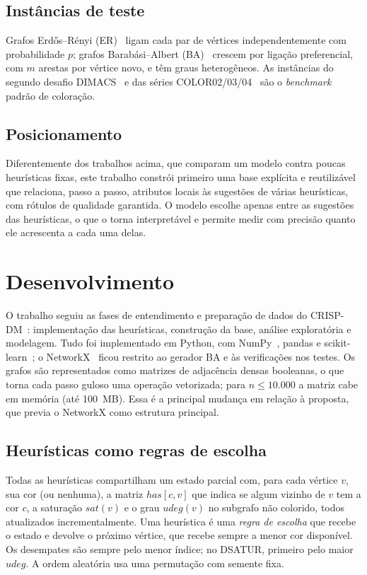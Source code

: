 \documentclass[conference,a4paper]{IEEEtran}
\begin{document}
\subsection{Instâncias de teste}
Grafos Erdős–Rényi (ER)~\cite{erdos1959} ligam cada par de vértices independentemente com
probabilidade $p$; grafos Barabási–Albert (BA)~\cite{barabasi1999} crescem por ligação
preferencial, com $m$ arestas por vértice novo, e têm graus heterogêneos. As instâncias do
segundo desafio DIMACS~\cite{johnson1996} e das séries COLOR02/03/04~\cite{color04} são o
\emph{benchmark} padrão de coloração.

\subsection{Posicionamento}
Diferentemente dos trabalhos acima, que comparam um modelo contra poucas heurísticas fixas,
este trabalho constrói primeiro uma base explícita e reutilizável que relaciona, passo a
passo, atributos locais às sugestões de várias heurísticas, com rótulos de qualidade
garantida. O modelo escolhe apenas entre as sugestões das heurísticas, o que o torna
interpretável e permite medir com precisão quanto ele acrescenta a cada uma delas.

\section{Desenvolvimento}\label{sec:dev}

O trabalho seguiu as fases de entendimento e preparação de dados do
CRISP-DM~\cite{wirth2000}: implementação das heurísticas, construção da base, análise
exploratória e modelagem. Tudo foi implementado em Python, com NumPy~\cite{harris2020},
pandas e scikit-learn~\cite{pedregosa2011}; o NetworkX~\cite{hagberg2008} ficou restrito ao
gerador BA e às verificações nos testes. Os grafos são representados como matrizes de
adjacência densas booleanas, o que torna cada passo guloso uma operação vetorizada; para
$n \le 10.000$ a matriz cabe em memória (até 100~MB). Essa é a principal mudança em relação à
proposta, que previa o NetworkX como estrutura principal.

\subsection{Heurísticas como regras de escolha}\label{sec:heur}
Todas as heurísticas compartilham um estado parcial com, para cada vértice $v$, sua cor
(ou nenhuma), a matriz $\mathit{has}[c,v]$ que indica se algum vizinho de $v$ tem a cor $c$, a
saturação $\mathit{sat}(v)$ e o grau $\mathit{udeg}(v)$ no subgrafo não colorido, todos
atualizados incrementalmente. Uma heurística é uma \emph{regra de escolha} que recebe o estado
e devolve o próximo vértice, que recebe sempre a menor cor disponível. Os desempates são
sempre pelo menor índice; no DSATUR, primeiro pelo maior $\mathit{udeg}$. A ordem aleatória
usa uma permutação com semente fixa.
\end{document}
